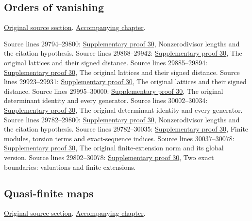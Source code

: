 \subsection{Orders of vanishing}
\hypertarget{algebra-source-section-orders-of-vanishing}{}
\noindent\href{https://github.com/stacks/stacks-project/blob/a04446e57ec1fbc252a871afcec7752fb2807b14/algebra.tex\#L29779}{Original source section}. \href{algebra.pdf\#nameddest=section-orders-of-vanishing}{Accompanying chapter}.

\begin{AlgebraSourceRoutes}
 Source lines 29794--29800: \hyperlink{algebra_orders_notes_20260928}{Supplementary proof 30}, Nonzerodivisor lengths and the citation hypothesis.
 Source lines 29868--29942: \hyperlink{algebra_orders_notes_20260928}{Supplementary proof 30}, The original lattices and their signed distance.
 Source lines 29885--29894: \hyperlink{algebra_orders_notes_20260928}{Supplementary proof 30}, The original lattices and their signed distance.
 Source lines 29923--29931: \hyperlink{algebra_orders_notes_20260928}{Supplementary proof 30}, The original lattices and their signed distance.
 Source lines 29995--30000: \hyperlink{algebra_orders_notes_20260928}{Supplementary proof 30}, The original determinant identity and every generator.
 Source lines 30002--30034: \hyperlink{algebra_orders_notes_20260928}{Supplementary proof 30}, The original determinant identity and every generator.
 Source lines 29782--29800: \hyperlink{algebra_orders_notes_20260928}{Supplementary proof 30}, Nonzerodivisor lengths and the citation hypothesis.
 Source lines 29782--30035: \hyperlink{algebra_orders_notes_20260928}{Supplementary proof 30}, Finite modules, torsion terms and exact-sequence indices.
 Source lines 30037--30078: \hyperlink{algebra_orders_notes_20260928}{Supplementary proof 30}, The original finite-extension norm and its global version.
 Source lines 29802--30078: \hyperlink{algebra_orders_notes_20260928}{Supplementary proof 30}, Two exact boundaries: valuations and finite extensions.
\end{AlgebraSourceRoutes}

\subsection{Quasi-finite maps}
\hypertarget{algebra-source-section-quasi-finite}{}
\noindent\href{https://github.com/stacks/stacks-project/blob/a04446e57ec1fbc252a871afcec7752fb2807b14/algebra.tex\#L30093}{Original source section}. \href{algebra.pdf\#nameddest=section-quasi-finite}{Accompanying chapter}.

